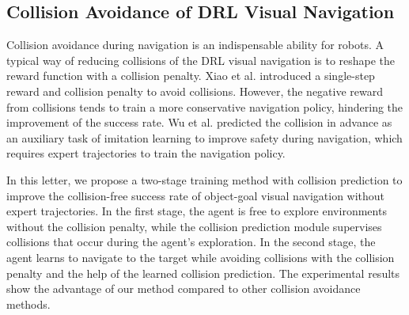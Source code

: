 \subsection{Collision Avoidance of DRL Visual Navigation}
Collision avoidance during navigation is an indispensable ability for robots. A typical way of reducing collisions of the DRL visual navigation is to reshape the reward function with a collision penalty\cite{humanoid, drqn, coll1}. Xiao et al.\cite{coll1} introduced a single-step reward and collision penalty to avoid collisions. However, the negative reward from collisions tends to train a more conservative navigation policy, hindering the improvement of the success rate. Wu et al.\cite{dual} predicted the collision in advance as an auxiliary task of imitation learning to improve safety during navigation, which requires expert trajectories to train the navigation policy. 

In this letter, we propose a two-stage training method with collision prediction to improve the collision-free success rate of object-goal visual navigation without expert trajectories. In the first stage, the agent is free to explore environments without the collision penalty, while the collision prediction module supervises collisions that occur during the agent's exploration. In the second stage, the agent learns to navigate to the target while avoiding collisions with the collision penalty and the help of the learned collision prediction. The experimental results show the advantage of our method compared to other collision avoidance methods.